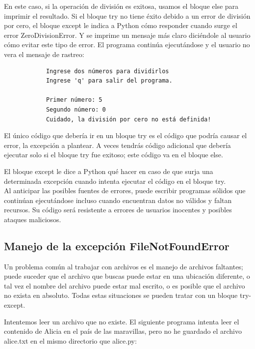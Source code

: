 En este caso, si la operación de división es exitosa, usamos el bloque {\ttfamily else} para imprimir el resultado.
Si el bloque {\ttfamily try} no tiene éxito debido a un error de división por cero, el bloque {\ttfamily except} le indica a Python cómo responder cuando surge el error {\ttfamily ZeroDivisionError}. Y se imprime  un mensaje más claro diciéndole al usuario cómo evitar este tipo de error. El programa continúa ejecutándose y el usuario no vera el mensaje de rastreo:

{\ttfamily\scriptsize\scriptsize 
	\hspace{-0.65cm} \vspace{-0.3cm}	
	{\color{blue} 	
		\begin{verbatim}
			Ingrese dos números para dividirlos
			Ingrese 'q' para salir del programa.
			
			Primer número: 5
			Segundo número: 0
			Cuidado, la división por cero no está definida!
		\end{verbatim}
}}

El único código que debería ir en un bloque {\ttfamily try} es el código que podría causar el error, la excepción a plantear. 
A veces tendrás código adicional que debería ejecutar solo si el bloque {\ttfamily try} fue exitoso; este código va en el 
bloque  {\ttfamily else}.

El bloque  {\ttfamily except} le dice a Python qué hacer en caso de que surja una determinada excepción
cuando intenta ejecutar el código en el bloque  {\ttfamily try}.\\

Al anticipar las posibles fuentes de errores, puede escribir programas sólidos
que continúan ejecutándose incluso cuando encuentran datos no válidos y faltan recursos. 
Su código será resistente a errores de usuarios inocentes y posibles ataques maliciosos.


\subsection{Manejo de la excepción FileNotFoundError}

Un problema común al trabajar con archivos es el manejo de archivos faltantes; puede suceder que el archivo que  buscas puede estar en una ubicación diferente, o tal vez el nombre del archivo puede estar mal escrito, o es posible que el archivo no exista en absoluto. Todas estas situaciones se pueden tratar con un bloque {\ttfamily try-except}.

Intentemos leer un archivo que no existe. El siguiente programa intenta
leer el contenido de {\ttfamily Alicia en el país de las maravillas}, pero no he guardado el archivo  {\ttfamily alice.txt} en el mismo directorio que {\ttfamily alice.py}:

